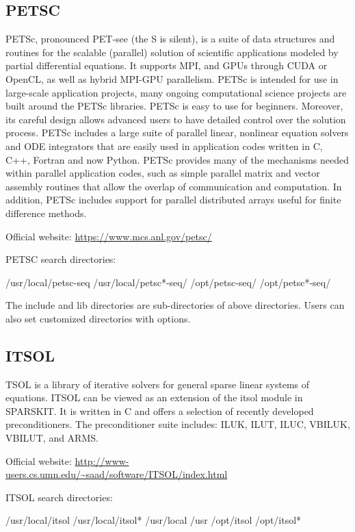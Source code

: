 \subsection{PETSC}
PETSc, pronounced PET-see (the S is silent), is a suite of data structures and routines for the scalable (parallel) solution of scientific applications modeled by partial differential equations. It supports MPI, and GPUs through CUDA or OpenCL, as well as hybrid MPI-GPU parallelism. PETSc is intended for use in large-scale application projects, many ongoing computational science projects are built around the PETSc libraries. PETSc is easy to use for beginners. Moreover, its careful design allows advanced users to have detailed control over the solution process. PETSc includes a large suite of parallel linear, nonlinear equation solvers and ODE integrators that are easily used in application codes written in C, C++, Fortran and now Python. PETSc provides many of the mechanisms needed within parallel application codes, such as simple parallel matrix and vector assembly routines that allow the overlap of communication and computation. In addition, PETSc includes support for parallel distributed arrays useful for finite difference methods. 

Official website: \url{https://www.mcs.anl.gov/petsc/}

PETSC search directories:
\begin{evb}
/usr/local/petsc-seq
/usr/local/petsc*-seq/
/opt/petsc-seq/
/opt/petsc*-seq/
\end{evb}

The include and lib directories are sub-directories of above directories. Users can also set customized directories with options.


\subsection{ITSOL}
TSOL is a library of iterative solvers for general sparse linear systems of equations. ITSOL can be viewed as an extension of the itsol module in SPARSKIT. It is written in C and offers a selection of recently developed preconditioners. The preconditioner suite includes: ILUK, ILUT, ILUC, VBILUK, VBILUT, and ARMS. 

Official website: \url{http://www-users.cs.umn.edu/~saad/software/ITSOL/index.html}

ITSOL search directories:
\begin{evb}
/usr/local/itsol
/usr/local/itsol*
/usr/local
/usr
/opt/itsol 
/opt/itsol*
\end{evb}

